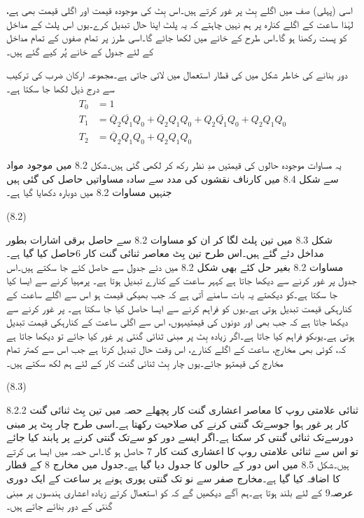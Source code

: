 اسی  (پہلی) صف میں اگلے بِٹ   پر غور کرتے ہیں۔اس بِٹ کی موجودہ قیمت  اور اگلی قیمت بھی  ہے، لہٰذا ساعت کے اگلے کنارہ پر  ہم نہیں چاہتے کہ یہ پلٹ اپنا حال تبدیل کرے۔یوں اس پلٹ کے مداخل   کو پست رکھنا ہو گا۔اس طرح   کے خانے  میں   لکھا جائے گا۔اسی طرز پر تمام صفوں کے تمام مداخل کے لئے جدول کے   خانے پُر کیے گئے ہیں۔


دور بنانے کی خاطر شکل  میں   کی قطار استعمال  میں  لائی  جاتی ہے۔مجموعہ ارکان ضرب کی ترکیب سے درج ذیل   لکھا جا سکتا ہے۔
\begin{gather}
\begin{aligned}
T_0&=1\\
T_1&=\overline{Q}_2\overline{Q_1} Q_0+\overline{Q}_2 Q_1 Q_0+Q_2\overline{Q_1} Q_0+Q_2Q_1Q_0\\
T_2&=\overline{Q}_2 Q_1 Q_0+Q_2Q_1Q_0
\end{aligned}
\end{gather}

	یہ مساوات موجودہ حالوں کی قیمتیں مدِ نظر رکھ کر لکھی گئی ہیں۔شکل 8.2 میں موجود مواد سے شکل 8.4 میں کارناف نقشوں کی مدد سے سادہ مساواتیں حاصل کی گئی ہیں جنہیں مساوات 8.2 میں دوبارہ دکھایا گیا ہے۔



 
(8.2)

	شکل 8.3 میں تین پلٹ لگا کر ان کو مساوات 8.2 سے حاصل برقی اشارات بطور مداخل دئے گئے ہیں۔اس طرح تین بِٹ معاصر ثنائی گنت کار  6حاصل کیا گیا ہے۔
	مساوات 8.2 بغیر حل کئے بھی شکل 8.2 میں دئے جدول سے حاصل کئے جا سکتے ہیں۔اس جدول پر غور کرنے سے دیکھا جاتا ہے کہہر ساعت کے کنارے تبدیل ہوتا ہے۔ پرمہیا کرنے سے ایسا کیا جا سکتا ہے۔کو دیکھتے یہ بات سامنے آتی ہے کہ جب بھیکی قیمت ہو اس سے اگلے ساعت کے کنارہکی قیمت تبدیل ہوتی ہے۔یوں کو فراہم کرنے سے ایسا حاصل کیا جا سکتا ہے۔ پر غور کرنے سے دیکھا جاتا ہے کہ جب بھی اور دونوں کی قیمتیںہوں، اس سے اگلی ساعت کے کنارہکی قیمت تبدیل ہوتی ہے۔یوںکو فراہم کیا جاتا ہے۔اگر زیادہ بِٹ پر مبنی ثنائی گنتی پر غور کیا جائے تو دیکھا جاتا ہے کہ، کوئی بھی مخارج، ساعت کے اگلے کنارے، اس وقت حال تبدیل کرتا ہے جب اس سے کمتر تمام مخارج کی قیمتہو جائے۔یوں چار بِٹ ثنائی گنت کار کے لئے ہم لکھ سکتے ہیں۔

 
(8.3)


8.2.2 ثنائی علامتی روپ کا معاصر اعشاری گنت کار
	پچھلے حصہ میں تین بِٹ ثنائی گنت کار پر غور ہوا جوسےتک گنتی کرنے کی صلاحیت رکھتا ہے۔اسی طرح چار بِٹ پر مبنی دورسےتک ثنائی گنتی کر سکتا ہے۔اگر ایسے دور کو سےتک گنتی کرنے پر پابند کیا جائے تو اس سے ثنائی علامتی روپ کا اعشاری کنت کار 7 حاصل ہو گا۔اس حصہ میں ایسا ہی کرتے ہیں۔شکل 8.5 میں اس دور کے حالوں کا جدول دیا گیا ہے۔جدول میں مخارج 8 کے قطار کا اضافہ کیا گیا ہے۔مخارج صفر سے نو تک گنتی پوری ہونے پر ساعت کے ایک دوری عرصہ9 کے لئے بلند ہوتا ہے۔ہم آگے دیکھیں گے کہ  کو استعمال کرتے زیادہ اعشاری ہندسوں پر مبنی گنتی کے دور بنائے جاتے ہیں۔




